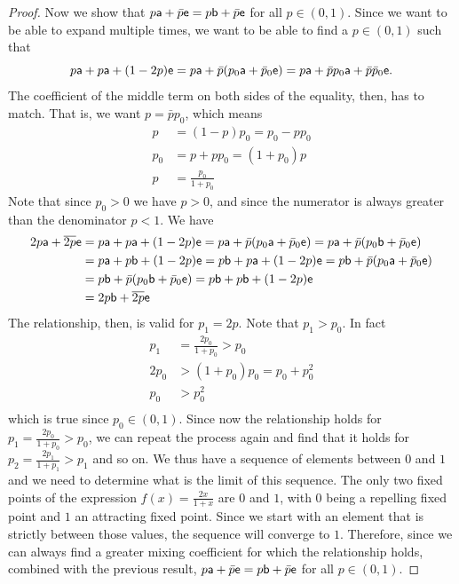 \begin{mathSection}
\begin{proof}
	Now we show that $p\ens[a] + \bar{p} \ens = p \ens[b] + \bar{p} \ens$ for all $p \in (0,1)$. Since we want to be able to expand multiple times, we want to be able to find a $p \in (0,1)$ such that
	\begin{equation}
		p \ens[a] + p \ens[a] + (1-2p) \ens = p \ens[a] + \bar{p} (p_0 \ens[a] + \bar{p}_0 \ens)= p \ens[a] + \bar{p} p_0 \ens[a] + \bar{p} \bar{p}_0 \ens.
	\end{equation}
	The coefficient of the middle term on both sides of the equality, then, has to match. That is, we want $p = \bar{p} p_0$, which means
	\begin{equation}
		\begin{aligned}
			p&=(1-p)p_0=p_0 - p p_0 \\
			p_0 &= p + p p_0 = (1+p_0) p  \\
			p &= \frac{p_0}{1+p_0}
		\end{aligned}
	\end{equation}
	Note that since $p_0 > 0$ we have $p>0$, and since the numerator is always greater than the denominator $p < 1$. We have
	\begin{equation}
		\begin{aligned}
			2p \ens[a] + \overline{2p} \ens &=  p \ens[a] + p \ens[a] + (1-2p) \ens =  p \ens[a] + \bar{p} (p_0 \ens[a] + \bar{p}_0 \ens) = p \ens[a] + \bar{p} (p_0 \ens[b] + \bar{p}_0 \ens) \\
			&= p \ens[a] + p \ens[b] + (1-2p) \ens = p \ens[b] + p \ens[a] + (1-2p) \ens = p \ens[b] + \bar{p} (p_0 \ens[a] + \bar{p}_0 \ens) \\
			&= p \ens[b] + \bar{p} (p_0 \ens[b] + \bar{p}_0 \ens) = p \ens[b] + p \ens[b] + (1-2p) \ens \\
			&= 2p \ens[b] + \overline{2p} \ens
		\end{aligned}
	\end{equation}
	The relationship, then, is valid for $p_1 = 2p$. Note that $p_1 > p_0$. In fact
	\begin{equation}
		\begin{aligned}
			p_1 &= \frac{2p_0}{1+p_0} > p_0  \\
			2 p_0 &> (1+p_0) p_0 = p_0 + p_0^2 \\
			p_0 &> p_0^2 \\
		\end{aligned}
	\end{equation}
	which is true since $p_0 \in (0,1)$. Since now the relationship holds for $p_1 = \frac{2 p_0}{1+p_0} > p_0 $, we can repeat the process again and find that it holds for $p_2 = \frac{2 p_1}{1+p_1} > p_1$ and so on. We thus have a sequence of elements between $0$ and $1$ and we need to determine what is the limit of this sequence. The only two fixed points of the expression $f(x) = \frac{2x}{1+x}$ are $0$ and $1$, with $0$ being a repelling fixed point and $1$ an attracting fixed point. Since we start with an element that is strictly between those values, the sequence will converge to $1$. Therefore, since we can always find a greater mixing coefficient for which the relationship holds, combined with the previous result, $p\ens[a] + \bar{p} \ens = p \ens[b] + \bar{p} \ens$ for all $p \in (0,1)$.
	

\end{proof}
\end{mathSection}
